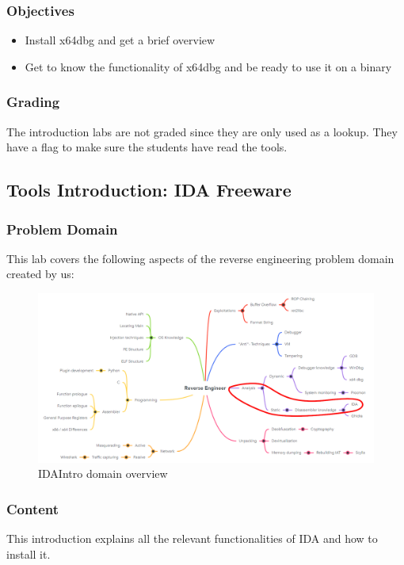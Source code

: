 \subsubsection*{Objectives}
\begin{itemize}
    \item Install x64dbg and get a brief overview
    \item Get to know the functionality of x64dbg and be ready to use it on a binary
\end{itemize}
\subsubsection*{Grading}
The introduction labs are not graded since they are only used as a lookup. They have a flag to make sure the students have read the tools.
\pagebreak

\subsection{Tools Introduction: IDA Freeware}
\subsubsection*{Problem Domain}
This lab covers the following aspects of the reverse engineering problem domain created by us:
\vspace{-2ex}
\begin{figure}[H]
    \includegraphics[width=\textwidth]{resources/IDAIntro-overview-light.png}
    \caption{IDAIntro domain overview}
    \label{fig:IDAIntro-overview}
\end{figure}
\subsubsection*{Content}
This introduction explains all the relevant functionalities of IDA and how to install it.
